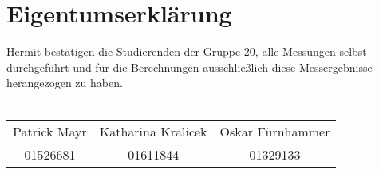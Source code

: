 \chapter{Eigentumserklärung}
Hermit bestätigen die Studierenden der Gruppe 20, alle Messungen selbst durchgeführt und für die Berechnungen ausschließlich diese Messergebnisse herangezogen zu haben. \\ \\
\begin{tabular*}{\textwidth}{c|c|c}
	Patrick Mayr & Katharina Kralicek & Oskar Fürnhammer \\ 
	01526681 & 01611844 & 01329133 \\ 
\end{tabular*}